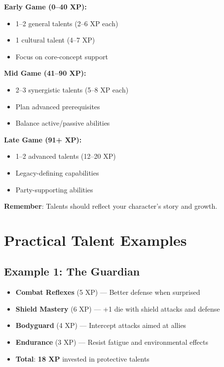 \begin{tcolorbox}[colback=purple!5!white,colframe=purple!75!black,title=Talent Selection Guide,fonttitle=\bfseries]
\textbf{Early Game (0--40 XP):}
\begin{itemize}
\item 1--2 general talents (2--6 XP each)
\item 1 cultural talent (4--7 XP)
\item Focus on core-concept support
\end{itemize}

\textbf{Mid Game (41--90 XP):}
\begin{itemize}
\item 2--3 synergistic talents (5--8 XP each)
\item Plan advanced prerequisites
\item Balance active/passive abilities
\end{itemize}

\textbf{Late Game (91+ XP):}
\begin{itemize}
\item 1--2 advanced talents (12--20 XP)
\item Legacy-defining capabilities
\item Party-supporting abilities
\end{itemize}

\textbf{Remember}: Talents should reflect your character's story and growth.
\end{tcolorbox}

\section{Practical Talent Examples}

\subsection*{Example 1: The Guardian}
\begin{itemize}
\item \textbf{Combat Reflexes} (5 XP) --- Better defense when surprised
\item \textbf{Shield Mastery} (6 XP) --- +1 die with shield attacks and defense
\item \textbf{Bodyguard} (4 XP) --- Intercept attacks aimed at allies
\item \textbf{Endurance} (3 XP) --- Resist fatigue and environmental effects
\item \textbf{Total}: \textbf{18 XP} invested in protective talents
\end{itemize}

